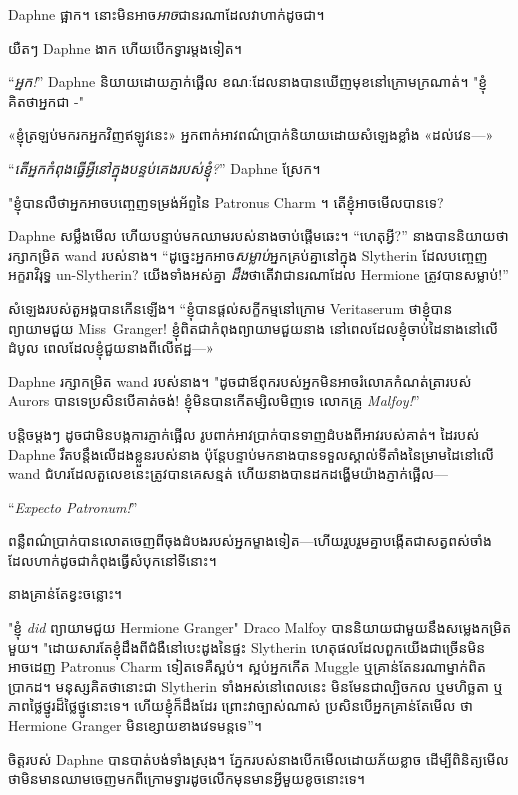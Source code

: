 Daphne ផ្អាក។ នោះមិនអាច\emph{អាច}ជានរណាដែលវាហាក់ដូចជា។

យឺតៗ Daphne ងាក ហើយបើកទ្វារម្តងទៀត។

“\emph{អ្នក!}” Daphne និយាយដោយភ្ញាក់ផ្អើល ខណៈដែលនាងបានឃើញមុខនៅក្រោមក្រណាត់។ "ខ្ញុំគិតថាអ្នកជា -"

«ខ្ញុំ​ត្រឡប់​មក​រក​អ្នក​វិញ​ឥឡូវ​នេះ» អ្នក​ពាក់​អាវ​ពណ៌​ប្រាក់​និយាយ​ដោយ​សំឡេង​ខ្លាំង «ដល់​វេន—»

“\emph{តើអ្នកកំពុងធ្វើអ្វីនៅក្នុងបន្ទប់គេងរបស់ខ្ញុំ?}” Daphne ស្រែក។

"ខ្ញុំបានលឺថាអ្នកអាចបញ្ចេញទម្រង់អ័ព្ទនៃ Patronus Charm ។ តើខ្ញុំអាចមើលបានទេ?

Daphne សម្លឹងមើល ហើយបន្ទាប់មកឈាមរបស់នាងចាប់ផ្តើមឆេះ។ “ហេតុអ្វី?” នាងបាននិយាយថារក្សាកម្រិត wand របស់នាង។ “ដូច្នេះអ្នកអាច\emph{សម្លាប់}អ្នកគ្រប់គ្នានៅក្នុង Slytherin ដែលបញ្ចេញអក្ខរាវិរុទ្ធ un-Slytherin? យើងទាំងអស់គ្នា \emph{ដឹង}ថាតើវាជានរណាដែល Hermione ត្រូវបានសម្លាប់!”

សំឡេង​របស់​តួ​អង្គ​បាន​កើន​ឡើង។ “ខ្ញុំបានផ្តល់សក្ខីកម្មនៅក្រោម Veritaserum ថាខ្ញុំបានព្យាយាមជួយ Miss~Granger! ខ្ញុំពិតជាកំពុងព្យាយាមជួយនាង នៅពេលដែលខ្ញុំចាប់ដៃនាងនៅលើដំបូល ពេលដែលខ្ញុំជួយនាងពីលើឥដ្ឋ—»

Daphne រក្សាកម្រិត wand របស់នាង។ "ដូចជាឪពុករបស់អ្នកមិនអាចរំលោភកំណត់ត្រារបស់ Aurors បានទេប្រសិនបើគាត់ចង់! ខ្ញុំ​មិន​បាន​កើត​ម្សិល​មិញ​ទេ លោក​គ្រូ \emph{ Malfoy!}”

បន្តិច​ម្តងៗ ដូចជា​មិន​បង្ក​ការ​ភ្ញាក់​ផ្អើល រូប​ពាក់​អាវ​ប្រាក់​បាន​ទាញ​ដំបង​ពី​អាវ​របស់​គាត់។ ដៃរបស់ Daphne រឹតបន្តឹងលើដងខ្លួនរបស់នាង ប៉ុន្តែបន្ទាប់មកនាងបានទទួលស្គាល់ទីតាំងនៃម្រាមដៃនៅលើ wand ជំហរដែលតួលេខនេះត្រូវបានគេសន្មត់ ហើយនាងបានដកដង្ហើមយ៉ាងភ្ញាក់ផ្អើល—

“\emph{Expecto Patronum!}”

ពន្លឺ​ពណ៌​ប្រាក់​បាន​លោត​ចេញ​ពី​ចុង​ដំបង​របស់​អ្នក​ម្ខាង​ទៀត—ហើយ​រួប​រួម​គ្នា​បង្កើត​ជា​សត្វ​ពស់​ចាំង​ដែល​ហាក់​ដូច​ជា​កំពុង​ធ្វើ​សំបុក​នៅ​ទី​នោះ។

នាង​គ្រាន់​តែ​ខ្វះ​ចន្លោះ។

"ខ្ញុំ \emph{did} ព្យាយាមជួយ Hermione Granger" Draco Malfoy បាននិយាយជាមួយនឹងសម្លេងកម្រិតមួយ។ "ដោយសារតែខ្ញុំដឹងពីជំងឺនៅបេះដូងនៃផ្ទះ Slytherin ហេតុផលដែលពួកយើងជាច្រើនមិនអាចដេញ Patronus Charm ទៀតទេគឺស្អប់។ ស្អប់អ្នកកើត Muggle ឬគ្រាន់តែនរណាម្នាក់ពិតប្រាកដ។ មនុស្សគិតថានោះជា Slytherin ទាំងអស់នៅពេលនេះ មិនមែនជាល្បិចកល ឬមហិច្ឆតា ឬភាពថ្លៃថ្នូរដ៏ថ្លៃថ្នូនោះទេ។ ហើយខ្ញុំក៏ដឹងដែរ ព្រោះវាច្បាស់ណាស់ ប្រសិនបើអ្នកគ្រាន់តែមើល ថា Hermione Granger មិនខ្សោយខាងវេទមន្តទេ”។

ចិត្តរបស់ Daphne បានបាត់បង់ទាំងស្រុង។ ភ្នែក​របស់​នាង​បើក​មើល​ដោយ​ភ័យ​ខ្លាច ដើម្បី​ពិនិត្យ​មើល​ថា​មិន​មាន​ឈាម​ចេញ​មក​ពី​ក្រោម​ទ្វារ​ដូច​លើក​មុន​មាន​អ្វី​មួយ​ខូច​នោះ​ទេ។


